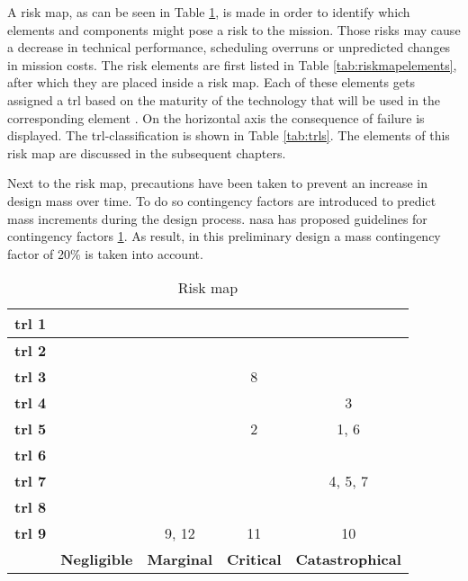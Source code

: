 A risk map, as can be seen in Table \ref{tab:riskmap}, is made in order to identify which elements and components might pose a risk to the mission. Those risks may cause a decrease in technical performance, scheduling overruns or unpredicted changes in mission costs. The risk elements are first listed in Table \ref{tab:riskmapelements}, after which they are placed inside a risk map. Each of these elements gets assigned a \gls{trl} based on the maturity of the technology that will be used in the corresponding element \cite{NASA2007}. On the horizontal axis the consequence of failure is displayed. The \gls{trl}-classification is shown in Table \ref{tab:trls}. The elements of this risk map are discussed in the subsequent chapters. 

Next to the risk map, precautions have been taken to prevent an increase in design mass over time. To do so contingency factors are introduced to predict mass increments during the design process. \gls{nasa} has proposed guidelines for contingency factors \ref{tab:riskmap}. As result, in this preliminary design a mass contingency factor of 20\% is taken into account.

\begin{table}[h]
	\centering
	\caption{Risk map}
	\label{tab:riskmap}
	\begin{tabular}{|c|c|c|c|c|} %
		\hline
		\textbf{\gls{trl} 1} & \cellcolor{green!70} & \cellcolor{yellow!75}  & \cellcolor{red!60} & \cellcolor{red!60}  \\ \hline
		\textbf{\gls{trl} 2} & \cellcolor{green!70} & \cellcolor{yellow!75}  & \cellcolor{red!60} & \cellcolor{red!60} \\ \hline
		\textbf{\gls{trl} 3} & \cellcolor{green!70} & \cellcolor{yellow!75} & \cellcolor{yellow!75} 8 & \cellcolor{red!60}  \\ \hline
		\textbf{\gls{trl} 4} & \cellcolor{green!70} & \cellcolor{yellow!75} & \cellcolor{yellow!75} & \cellcolor{yellow!75} 3 \\ \hline
		\textbf{\gls{trl} 5} & \cellcolor{green!70} & \cellcolor{green!70} & \cellcolor{yellow!75} 2 & \cellcolor{yellow!75} 1, 6 \\ \hline
		\textbf{\gls{trl} 6} & \cellcolor{green!70} & \cellcolor{green!70} & \cellcolor{green!70} & \cellcolor{green!70}\\ \hline
		\textbf{\gls{trl} 7} & \cellcolor{green!70} & \cellcolor{green!70} & \cellcolor{green!70} & \cellcolor{green!70} 4, 5, 7 \\ \hline
		\textbf{\gls{trl} 8} & \cellcolor{green!70} & \cellcolor{green!70} & \cellcolor{green!70} & \cellcolor{green!70} \\ \hline
		\textbf{\gls{trl} 9} & \cellcolor{green!70} & \cellcolor{green!70} 9, 12 & \cellcolor{green!70} 11 & \cellcolor{green!70} 10  \\ \hline
		& \textbf{Negligible} & \textbf{Marginal} & \textbf{Critical} & \textbf{Catastrophical} \\ \hline
	\end{tabular}
\end{table}

